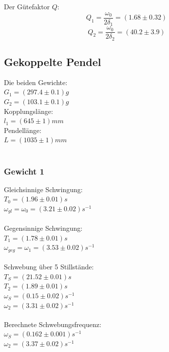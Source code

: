 \documentclass{article}
\begin{document}
Der Gütefaktor $Q$:\\
$$Q_1=\frac{\omega_0}{2\delta_1}=(1.68 \pm 0.32)$$
$$Q_2=\frac{\omega_0}{2\delta_2}=(40.2 \pm 3.9 )$$

\subsection{Gekoppelte Pendel}

Die beiden Gewichte:\\
$G_1=(297.4 \pm 0.1)\si{g}$\\
$G_2=(103.1 \pm 0.1)\si{g}$\\
Kopplungslänge:\\
$l_1=(645 \pm 1)\si{mm}$\\
Pendellänge:\\
$L=(1035 \pm 1)\si{mm}$\\
\\
\subsubsection{Gewicht 1}
Gleichsinnige Schwingung:\\
$T_0=(1.96 \pm 0.01)\si{s}$\\
$\omega_{gl}=\omega_0=(3.21 \pm 0.02)\si{s^{-1}}$\\
\\
Gegensinnige Schwingung:\\
$T_1=(1.78 \pm 0.01)\si{s}$\\
$\omega_{geg}=\omega_1=(3.53 \pm 0.02)\si{s^{-1}}$\\
\\
Schwebung über 5 Stillstände:\\
$T_S=(21.52 \pm 0.01)\si{s}$\\
$T_2=(1.89 \pm 0.01)\si{s}$\\
$\omega_S=(0.15 \pm 0.02)\si{s^{-1}}$\\
$\omega_2=(3.31 \pm 0.02)\si{s^{-1}}$\\
\\
Berechnete Schwebungsfrequenz:\\
$\omega_S=(0.162 \pm 0.001)\si{s^{-1}}$\\
$\omega_2=(3.37 \pm 0.02)\si{s^{-1}}$\\
\\
\end{document}
